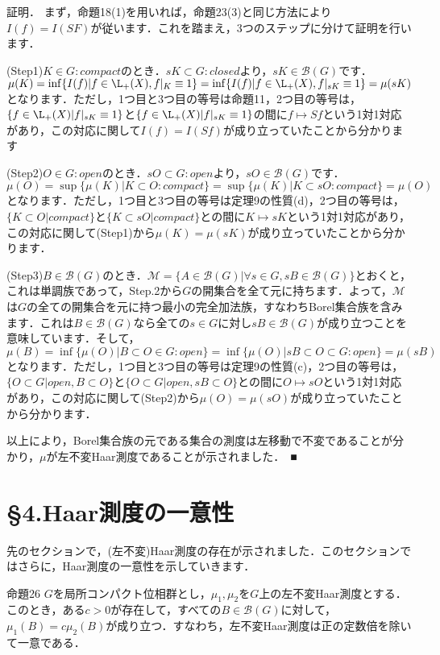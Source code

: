 証明．
まず，命題18(1)を用いれば，命題23(3)と同じ方法により$I(f)=I(SF)$が従います．これを踏まえ，3つのステップに分けて証明を行います．

(Step1)$K \in G \colon compact$のとき．$sK \subset G \colon closed$より，$sK \in  \mathscr{B}(G)$です．$\mu(K)= \inf \{ I(f) | f \in \L_{+}(X), f|_{K} \equiv 1 \}=\inf \{ I(f) | f \in \L_{+}(X), f|_{sK} \equiv 1 \}=\mu(sK)$となります．ただし，1つ目と3つ目の等号は命題11，2つ目の等号は，$\{ f \in \L_{+}(X) | f|_{sK} \equiv 1 \}$と$\{ f \in \L_{+}(X) | f|_{sK} \equiv 1 \}$の間に$f \mapsto Sf$という1対1対応があり，この対応に関して$I(f)=I(Sf)$が成り立っていたことから分かります

(Step2)$O \in G \colon open$のとき．$sO \subset G \colon open$より，$sO \in \mathscr{B}(G)$です．$\mu(O)= \sup \{ \mu(K) | K \subset O \colon compact \}=\sup \{ \mu(K) | K \subset sO \colon compact \} = \mu (O)$となります．ただし，1つ目と3つ目の等号は定理9の性質(d)，2つ目の等号は，$\{ K \subset O | compact \}$と$\{ K \subset sO | compact \}$との間に$K \mapsto sK$という1対1対応があり，この対応に関して(Step1)から$\mu(K)=\mu(sK)$が成り立っていたことから分かります．

(Step3)$B \in \mathscr{B}(G)$のとき．$\mathscr{M}=\{A \in \mathscr{B}(G) | \forall s \in G , sB \in \mathscr{B}(G) \}$とおくと，これは単調族であって，Step.2から$G$の開集合を全て元に持ちます．よって，$\mathscr{M}$は$G$の全ての開集合を元に持つ最小の完全加法族，すなわちBorel集合族を含みます．これは$B \in \mathscr{B}(G)$なら全ての$s \in G$に対し$ sB \in \mathscr{B}(G)$が成り立つことを意味しています．そして，$\mu(B)= \inf \{ \mu(O) | B \subset O \in G \colon open\}= \inf \{ \mu(O) | sB \subset O \subset G \colon open\} = \mu(sB)$となります．ただし，1つ目と3つ目の等号は定理9の性質(c)，2つ目の等号は，$\{ O \subset G | open, B \subset O \}$と$\{ O \subset G | open, sB \subset O \}$との間に$O \mapsto sO$という1対1対応があり，この対応に関して(Step2)から$\mu(O)=\mu(sO)$が成り立っていたことから分かります．

以上により，Borel集合族の元である集合の測度は左移動で不変であることが分かり，$\mu$が左不変Haar測度であることが示されました．　■

\section{\S 4.Haar測度の一意性}
先のセクションで，(左不変)Haar測度の存在が示されました．このセクションではさらに，Haar測度の一意性を示していきます．

命題26
$G$を局所コンパクト位相群とし，$\mu_1, \mu_2$を$G$上の左不変Haar測度とする．このとき，ある$c>0$が存在して，すべての$B \in \mathscr{B}(G)$に対して，$\mu_1(B)=c\mu_2(B)$が成り立つ．すなわち，左不変Haar測度は正の定数倍を除いて一意である．

